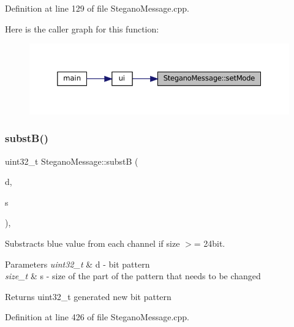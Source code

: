 Definition at line 129 of file Stegano\+Message.\+cpp.

Here is the caller graph for this function\+:\nopagebreak
\begin{figure}[H]
\begin{center}
\leavevmode
\includegraphics[width=350pt]{classSteganoMessage_a3e06a73baa5744b5eb9152f4ae65f458_icgraph}
\end{center}
\end{figure}
\mbox{\label{classSteganoMessage_a7eb6fd157c777b2947603d018610ad0f}} 
\subsubsection{\texorpdfstring{substB()}{substB()}}
{\footnotesize\ttfamily uint32\+\_\+t Stegano\+Message\+::substB (\begin{DoxyParamCaption}\item[{uint32\+\_\+t}]{d,  }\item[{size\+\_\+t}]{s }\end{DoxyParamCaption})\hspace{0.3cm}{\ttfamily [static]}, {\ttfamily [private]}}



Substracts blue value from each channel if size $>$= 24bit. 


\begin{DoxyParams}{Parameters}
{\em uint32\+\_\+t} & d -\/ bit pattern \\
\hline
{\em size\+\_\+t} & s -\/ size of the part of the pattern that needs to be changed \\
\hline
\end{DoxyParams}
\begin{DoxyReturn}{Returns}
uint32\+\_\+t generated new bit pattern 
\end{DoxyReturn}


Definition at line 426 of file Stegano\+Message.\+cpp.

